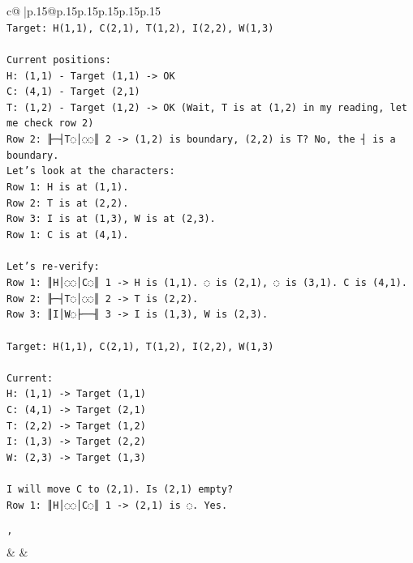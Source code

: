 \documentclass{article}
\begin{document}
{\begin{supertabular}{c@{$\;$}|p{.15\linewidth}@{}p{.15\linewidth}p{.15\linewidth}p{.15\linewidth}p{.15\linewidth}p{.15\linewidth}}
{{{\\ 
\texttt{Target: H(1,1), C(2,1), T(1,2), I(2,2), W(1,3)} \\
\\ 
\texttt{Current positions:} \\
\texttt{H: (1,1) {-} Target (1,1) {-}> OK} \\
\texttt{C: (4,1) {-} Target (2,1)} \\
\texttt{T: (1,2) {-} Target (1,2) {-}> OK (Wait, T is at (1,2) in my reading, let me check row 2)} \\
\texttt{Row 2: ╟─┤T◌│◌◌║ 2 {-}> (1,2) is boundary, (2,2) is T? No, the ┤ is a boundary.} \\
\texttt{Let's look at the characters:} \\
\texttt{Row 1: H is at (1,1).} \\
\texttt{Row 2: T is at (2,2).} \\
\texttt{Row 3: I is at (1,3), W is at (2,3).} \\
\texttt{Row 1: C is at (4,1).} \\
\\ 
\texttt{Let's re{-}verify:} \\
\texttt{Row 1: ║H│◌◌│C◌║ 1 {-}> H is (1,1). ◌ is (2,1), ◌ is (3,1). C is (4,1).} \\
\texttt{Row 2: ╟─┤T◌│◌◌║ 2 {-}> T is (2,2).} \\
\texttt{Row 3: ║I│W◌├──╢ 3 {-}> I is (1,3), W is (2,3).} \\
\\ 
\texttt{Target: H(1,1), C(2,1), T(1,2), I(2,2), W(1,3)} \\
\\ 
\texttt{Current:} \\
\texttt{H: (1,1) {-}> Target (1,1)} \\
\texttt{C: (4,1) {-}> Target (2,1)} \\
\texttt{T: (2,2) {-}> Target (1,2)} \\
\texttt{I: (1,3) {-}> Target (2,2)} \\
\texttt{W: (2,3) {-}> Target (1,3)} \\
\\ 
\texttt{I will move C to (2,1). Is (2,1) empty?} \\
\texttt{Row 1: ║H│◌◌│C◌║ 1 {-}> (2,1) is ◌. Yes.} \\
\\ 
\texttt{'} \\
            }
        }
    }
    & & \\ \\


\end{supertabular}}
\end{document}
